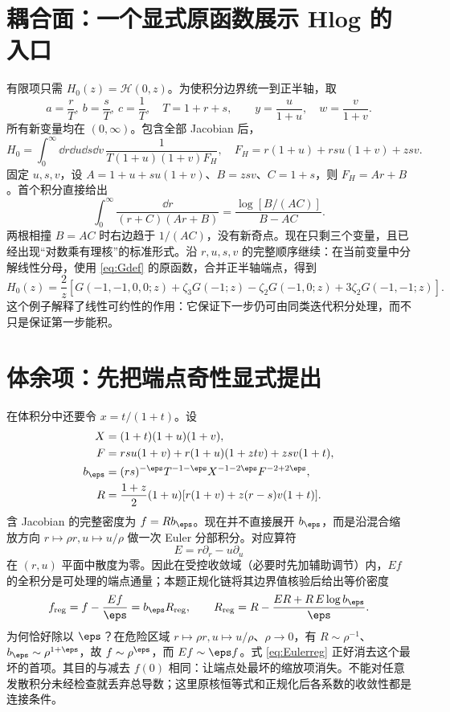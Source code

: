 \section{耦合面：一个显式原函数展示 Hlog 的入口}
有限项只需 $H_0(z)=\mathcal H(0,z)$。为使积分边界统一到正半轴，取
\begin{equation}
a=\frac rT,\ b=\frac sT,\ c=\frac1T,\quad T=1+r+s,
\qquad y=\frac u{1+u},\quad w=\frac v{1+v}.
\end{equation}
所有新变量均在 $(0,\infty)$。包含全部 Jacobian 后，
\begin{equation}
H_0=\int_0^\infty\!\dd r\dd u\dd s\dd v\,
\frac1{T(1+u)(1+v)F_H},
\quad F_H=r(1+u)+rsu(1+v)+zsv.
\end{equation}
固定 $u,s,v$，设 $A=1+u+su(1+v)$、$B=zsv$、$C=1+s$，则 $F_H=Ar+B$。首个积分直接给出
\begin{equation}
\int_0^\infty\frac{\dd r}{(r+C)(Ar+B)}
=\frac{\log[B/(AC)]}{B-AC}.
\label{eq:firstH}
\end{equation}
两根相撞 $B=AC$ 时右边趋于 $1/(AC)$，没有新奇点。现在只剩三个变量，且已经出现“对数乘有理核”的标准形式。沿 $r,u,s,v$ 的完整顺序继续：在当前变量中分解线性分母，使用 \eqref{eq:Gdef} 的原函数，合并正半轴端点，得到
\begin{equation}
H_0(z)=\frac2z\left[
G(-1,-1,0,0;z)+\zeta_3G(-1;z)
-\zeta_2G(-1,0;z)+3\zeta_2G(-1,-1;z)\right].
\label{eq:H0result}
\end{equation}
这个例子解释了线性可约性的作用：它保证下一步仍可由同类迭代积分处理，而不只是保证第一步能积。

\section{体余项：先把端点奇性显式提出}
在体积分中还要令 $x=t/(1+t)$。设
\begin{align}
X&=(1+t)(1+u)(1+v),\nonumber\\
F&=rsu(1+v)+r(1+u)(1+ztv)+zsv(1+t),\\
b_\eps&=(rs)^{-\eps}T^{-1-\eps}X^{-1-2\eps}F^{-2+2\eps},\\
R&=\frac{1+z}{2}(1+u)[r(1+v)+z(r-s)v(1+t)].
\end{align}
含 Jacobian 的完整密度为 $f=Rb_\eps$。现在并不直接展开 $b_\eps$，而是沿混合缩放方向 $r\mapsto\rho r,u\mapsto u/\rho$ 做一次 Euler 分部积分。对应算符
\begin{equation}
E=r\partial_r-u\partial_u
\end{equation}
在 $(r,u)$ 平面中散度为零。因此在受控收敛域（必要时先加辅助调节）内，$Ef$ 的全积分是可处理的端点通量；本题正规化链将其边界值核验后给出等价密度
\begin{equation}
f_{\rm reg}=f-\frac{Ef}{\eps}
=b_\eps R_{\rm reg},\qquad
R_{\rm reg}=R-\frac{ER+R\,E\log b_\eps}{\eps}.
\label{eq:Eulerreg}
\end{equation}
为何恰好除以 $\eps$？在危险区域 $r\mapsto\rho r,u\mapsto u/\rho$、$\rho\to0$，有 $R\sim\rho^{-1}$、$b_\eps\sim\rho^{1+\eps}$，故 $f\sim\rho^\eps$，而 $Ef\sim\eps f$。式 \eqref{eq:Eulerreg} 正好消去这个最坏的首项。其目的与减去 $f(0)$ 相同：让端点处最坏的缩放项消失。不能对任意发散积分未经检查就丢弃总导数；这里原核恒等式和正规化后各系数的收敛性都是连接条件。

